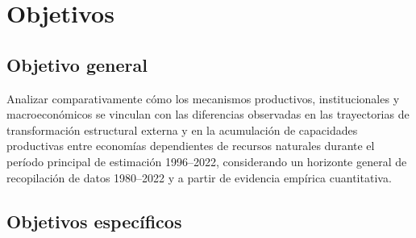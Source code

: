 \documentclass[../../PTFM.tex]{subfiles}
\begin{document}


	\chapter{Objetivos}
	\label{chap:objetivos}

	\section{Objetivo general}
	\label{sec:objetivo-general}



	Analizar comparativamente cómo los mecanismos productivos, institucionales y macroeconómicos se vinculan con las diferencias observadas en las trayectorias de transformación estructural externa y en la acumulación de capacidades productivas entre economías dependientes de recursos naturales durante el período principal de estimación 1996--2022, considerando un horizonte general de recopilación de datos 1980--2022 y a partir de evidencia empírica cuantitativa.



	\section{Objetivos específicos}

	\label{sec:objetivos-especificos}
\end{document}
